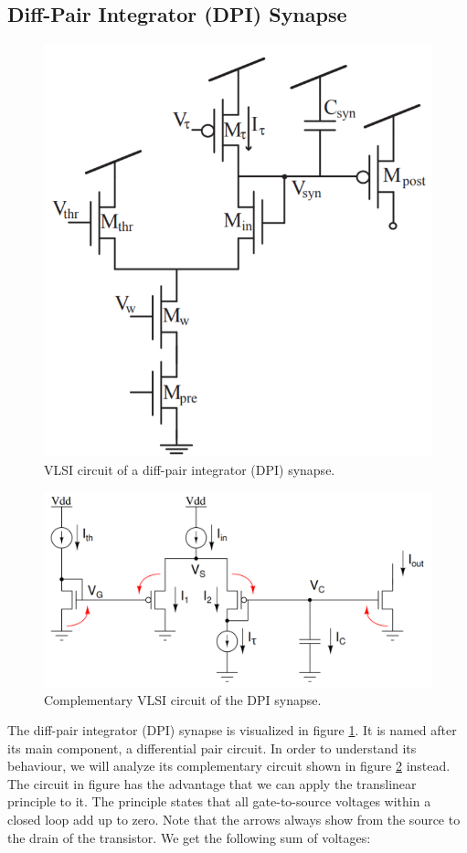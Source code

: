\subsection{Diff-Pair Integrator (DPI) Synapse}

\begin{figure}
    \centering
    \includegraphics[width=.7\linewidth]{Figures/dpi_synpase.PNG}
    \caption{VLSI circuit of a diff-pair integrator (DPI) synapse.}
    \label{fig:dpi_synapse}
\end{figure}

\begin{figure}
    \centering
    \includegraphics[width=\linewidth]{Figures/dpi_synapse_complementary.PNG}
    \caption{Complementary VLSI circuit of the DPI synapse.}
    \label{fig:dpi_synapse_complementary}
\end{figure}

The diff-pair integrator (DPI) synapse is visualized in figure \ref{fig:dpi_synapse}. It is named after its main component, a differential pair circuit. In order to understand its behaviour, we will analyze its complementary circuit shown in figure \ref{fig:dpi_synapse_complementary} instead. The circuit in figure  has the advantage that we can apply the translinear principle to it. The principle states that all gate-to-source voltages within a closed loop add up to zero. Note that the arrows always show from the source to the drain of the transistor. We get the following sum of voltages:

